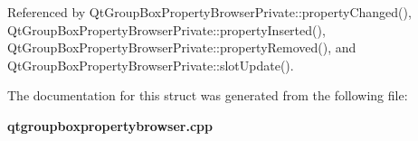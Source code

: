 Referenced by Qt\+Group\+Box\+Property\+Browser\+Private\+::property\+Changed(), Qt\+Group\+Box\+Property\+Browser\+Private\+::property\+Inserted(), Qt\+Group\+Box\+Property\+Browser\+Private\+::property\+Removed(), and Qt\+Group\+Box\+Property\+Browser\+Private\+::slot\+Update().



The documentation for this struct was generated from the following file\+:\begin{DoxyCompactItemize}
\item 
{\bf qtgroupboxpropertybrowser.\+cpp}\end{DoxyCompactItemize}
